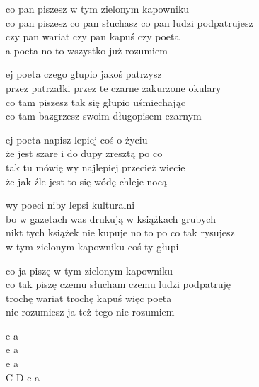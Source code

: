 \begin{text}
    co pan piszesz w tym zielonym kapowniku\\
    co pan piszesz co pan słuchasz co pan ludzi podpatrujesz\\
    czy pan wariat czy pan kapuś czy poeta\\
    a poeta no to wszystko już rozumiem

    ej poeta czego głupio jakoś patrzysz\\
    przez patrzałki przez te czarne zakurzone okulary\\
    co tam piszesz tak się głupio uśmiechając\\
    co tam bazgrzesz swoim długopisem czarnym

    ej poeta napisz lepiej coś o życiu\\
    że jest szare i do dupy zresztą po co\\
    tak tu mówię wy najlepiej przecież wiecie\\
    że jak źle jest to się wódę chleje nocą

    wy poeci niby lepsi kulturalni\\
    bo w gazetach was drukują w książkach grubych\\
    nikt tych książek nie kupuje no to po co tak rysujesz\\
    w tym zielonym kapowniku coś ty głupi

    co ja piszę w tym zielonym kapowniku\\
    co tak piszę czemu słucham czemu ludzi podpatruję\\
    trochę wariat trochę kapuś więc poeta\\
    nie rozumiesz ja też tego nie rozumiem
\end{text}
\begin{chord}
    e a\\
    e a\\
    e a\\
    C D e a
\end{chord}